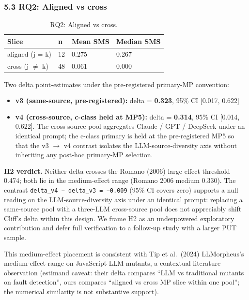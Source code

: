 \documentclass[review,12pt,authoryear]{elsarticle}
\providecommand{\tightlist}{\setlength{\itemsep}{0pt}\setlength{\parskip}{0pt}}
\begin{document}
\subsubsection{5.3 RQ2: Aligned vs cross}\label{rq2-aligned-vs-cross-cliffs-delta}

{\def\LTcaptype{table} %
\begin{longtable}[]{@{}llll@{}}
\caption{RQ2: Aligned vs cross.}\label{tab:p2-09}\\
\toprule\noalign{}
Slice & n & Mean SMS & Median SMS \\
\midrule\noalign{}
\endhead
\bottomrule\noalign{}
\endlastfoot
aligned (j = k) & 12 & 0.275 & 0.267 \\
cross (j $\neq$ k) & 48 & 0.061 & 0.000 \\
\end{longtable}
}

Two delta point-estimates under the pre-registered primary-MP
convention:

\begin{itemize}
\tightlist
\item
  \textbf{v3 (same-source, pre-registered):} delta = \textbf{0.323},
  95\% CI {[}0.017, 0.622{]}
\item
  \textbf{v4 (cross-source, c-class held at MP5):} delta =
  \textbf{0.314}, 95\% CI {[}0.014, 0.622{]}. The cross-source pool
  aggregates Claude / GPT / DeepSeek under an identical prompt; the
  c-class primary is held at the pre-registered MP5 so that the v3 $\to$ v4
  contrast isolates the LLM-source-diversity axis without inheriting any
  post-hoc primary-MP selection.
\end{itemize}

\textbf{H2 verdict.} Neither delta crosses the Romano (2006)
large-effect threshold 0.474; both lie in the medium-effect range
(Romano 2006 medium 0.330). The contrast
\texttt{delta\_v4\ −\ delta\_v3\ =\ −0.009} (95\% CI covers zero)
supports a null reading on the LLM-source-diversity axis under an
identical prompt: replacing a same-source pool with a three-LLM
cross-source pool does not appreciably shift Cliff's delta within this
design. We frame H2 as an underpowered exploratory contribution and
defer full verification to a follow-up study with a larger PUT sample.

This medium-effect placement is consistent with Tip et al.~(2024)
LLMorpheus's medium-effect range on JavaScript LLM mutants, a contextual
literature observation (estimand caveat: their delta compares ``LLM vs
traditional mutants on fault detection'', ours compares ``aligned vs
cross MP slice within one pool''; the numerical similarity is not
substantive support).
\end{document}
